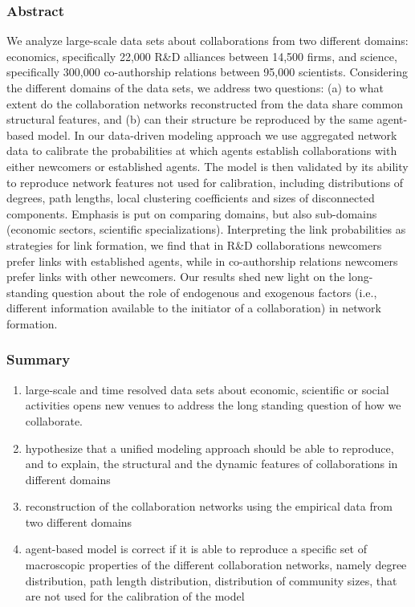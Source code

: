 \documentclass[12pt]{article}
\begin{document}
\subsubsection*{Abstract}

We analyze large-scale data sets about collaborations from two different domains: economics, specifically 22,000 R\&D alliances between 14,500 firms, and science, specifically 300,000 co-authorship relations between 95,000 scientists. Considering the different domains of the data sets, we address two questions: (a) to what extent do the collaboration networks reconstructed from the data share common structural features, and (b) can their structure be reproduced by the same agent-based model. In our data-driven modeling approach we use aggregated network data to calibrate the probabilities at which agents establish collaborations with either newcomers or established agents. The model is then validated by its ability to reproduce network features not used for calibration, including distributions of degrees, path lengths, local clustering coefficients and sizes of disconnected components. Emphasis is put on comparing domains, but also sub-domains (economic sectors, scientific specializations). Interpreting the link probabilities as strategies for link formation, we find that in R\&D collaborations newcomers prefer links with established agents, while in co-authorship relations newcomers prefer links with other newcomers. Our results shed new light on the long-standing question about the role of endogenous and exogenous factors (i.e., different information available to the initiator of a collaboration) in network formation.

\subsubsection*{Summary}

\begin{enumerate}
    \item large-scale and time resolved data sets about economic, scientific or social activities opens new venues to address the long standing question of how we collaborate.
    \item hypothesize that a unified modeling approach should be able to reproduce, and to explain, the structural and the dynamic features of collaborations in different domains
    \item reconstruction of the collaboration networks using the empirical data from two different domains
    \item agent-based model is correct if it is able to reproduce a specific set of macroscopic properties of the different collaboration networks, namely degree distribution, path length distribution, distribution of community sizes, that are not used for the calibration of the model
\end{enumerate}
\end{document}
